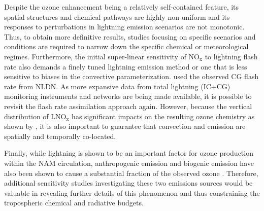 Despite the ozone enhancement being a relatively self-contained feature,
its spatial structures and chemical pathways are highly non-uniform and
its responses to perturbations in lightning emission scenarios are not
monotonic. Thus, to obtain more definitive results, studies focusing on
specific scenarios and conditions are required to narrow down the
specific chemical or meteorological regimes.
Furthermore, the initial super-linear sensitivity of NO$_\mathrm{x}$ to
lightning flash rate also demands a finely tuned lightning emission
method or one that is less sensitive to biases in the convective
parameterization. \citet{Cooper:2009nx} used the observed CG
flash rate from NLDN. As more expansive data from  total lightning (IC+CG)
monitoring instruments and networks are being made available, it is possible to
revisit the flash rate assimilation approach again. However, because
the vertical distribution of LNO$_\mathrm{x}$ has significant
impacts on the resulting ozone chemistry as shown by \citet{Pickering:1998sh}, it is also important to guarantee
that convection and emission are spatially and temporally co-located.


Finally, while lightning is shown to be an important factor for ozone
production within the NAM circulation, anthropogenic emission and
biogenic emission have also been shown to cause a substantial
fraction of the observed ozone \citep{Li:2005ss}. Therefore, additional
sensitivity studies investigating these two emissions sources would
be valuable in revealing further details of this phenomenon and
thus constraining the tropospheric chemical and radiative budgets.